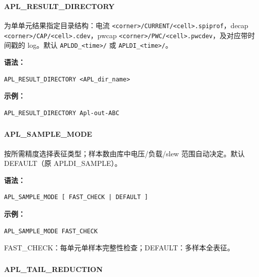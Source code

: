 \subsubsection{}
\paragraph*{APL_RESULT_DIRECTORY}

为单单元结果指定目录结构：电流 \texttt{<corner>/CURRENT/<cell>.spiprof}，decap \texttt{<corner>/CAP/<cell>.cdev}，pwcap \texttt{<corner>/PWC/<cell>.pwcdev}，及对应带时间戳的 log。默认 \texttt{APLDD\_<time>/} 或 \texttt{APLDI\_<time>/}。

\textbf{语法：}
\begin{lstlisting}
APL_RESULT_DIRECTORY <APL_dir_name>
\end{lstlisting}

\textbf{示例：}
\begin{lstlisting}
APL_RESULT_DIRECTORY Apl-out-ABC
\end{lstlisting}

\subsubsection{}
\paragraph*{APL_SAMPLE_MODE}

按所需精度选择表征类型；样本数由库中电压/负载/slew 范围自动决定。默认 DEFAULT（原 APLDI\_SAMPLE）。

\textbf{语法：}
\begin{lstlisting}
APL_SAMPLE_MODE [ FAST_CHECK | DEFAULT ]
\end{lstlisting}

\textbf{示例：}
\begin{lstlisting}
APL_SAMPLE_MODE FAST_CHECK
\end{lstlisting}

\begin{noteBox}
FAST\_CHECK：每单元单样本完整性检查；DEFAULT：多样本全表征。
\end{noteBox}

\subsubsection{}
\paragraph*{APL_TAIL_REDUCTION}

